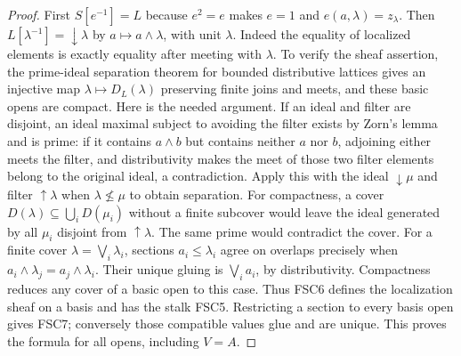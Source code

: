 \begin{proof}
First $S[e^{-1}]=L$ because $e^2=e$ makes $e=1$ and
$e(a,\lambda)=z_\lambda$. Then
$L[\lambda^{-1}]=\downarrow\lambda$ by $a\mapsto a\wedge\lambda$,
with unit $\lambda$. Indeed the equality of localized elements is
exactly equality after meeting with $\lambda$.
To verify the sheaf assertion, the prime-ideal separation theorem for
bounded distributive lattices gives an injective map
$\lambda\mapsto D_L(\lambda)$ preserving finite joins and meets, and
these basic opens are compact. Here is the needed argument.
If an ideal and filter are disjoint, an ideal maximal subject to
avoiding the filter exists by Zorn's lemma and is prime: if it contains
$a\wedge b$ but contains neither $a$ nor $b$, adjoining either meets
the filter, and distributivity makes the meet of those two filter
elements belong to the original ideal, a contradiction.
Apply this with the ideal $\downarrow\mu$ and filter
$\uparrow\lambda$ when $\lambda\nleq\mu$ to obtain separation.
For compactness, a cover $D(\lambda)\subseteq\bigcup_iD(\mu_i)$
without a finite subcover would leave the ideal generated by all
$\mu_i$ disjoint from $\uparrow\lambda$. The same prime would
contradict the cover.
For a finite cover $\lambda=\bigvee_i\lambda_i$, sections
$a_i\le\lambda_i$ agree on overlaps precisely when
$a_i\wedge\lambda_j=a_j\wedge\lambda_i$. Their unique gluing is
$\bigvee_i a_i$, by distributivity. Compactness reduces any cover of a
basic open to this case. Thus FSC6 defines the localization sheaf on
a basis and has the stalk FSC5. Restricting a section to every basis
open gives FSC7; conversely those compatible values glue and are
unique. This proves the formula for all opens, including $V=A$.
\end{proof}

